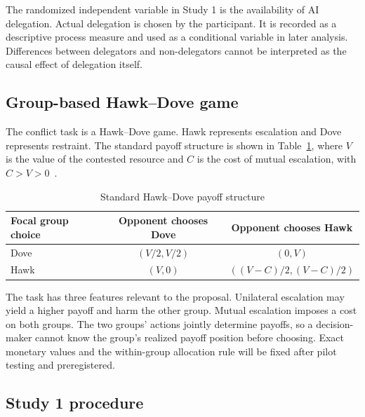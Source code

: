 \documentclass[11pt,a4paper]{article}
\begin{document}
The randomized independent variable in Study 1 is the availability of AI delegation. Actual delegation is chosen by the participant. It is recorded as a descriptive process measure and used as a conditional variable in later analysis. Differences between delegators and non-delegators cannot be interpreted as the causal effect of delegation itself.

\subsection{Group-based Hawk--Dove game}

The conflict task is a Hawk--Dove game. Hawk represents escalation and Dove represents restraint. The standard payoff structure is shown in Table~\ref{tab:hawk-dove}, where $V$ is the value of the contested resource and $C$ is the cost of mutual escalation, with $C>V>0$~\citep{MaynardSmithPrice1973}.

\begin{table}[H]
\centering
\caption{Standard Hawk--Dove payoff structure}
\label{tab:hawk-dove}
\begin{tabular}{lcc}
\toprule
\textbf{Focal group choice} & \textbf{Opponent chooses Dove} & \textbf{Opponent chooses Hawk}\\
\midrule
Dove & $(V/2,V/2)$ & $(0,V)$\\
Hawk & $(V,0)$ & $((V-C)/2,(V-C)/2)$\\
\bottomrule
\end{tabular}
\end{table}

The task has three features relevant to the proposal. Unilateral escalation may yield a higher payoff and harm the other group. Mutual escalation imposes a cost on both groups. The two groups' actions jointly determine payoffs, so a decision-maker cannot know the group's realized payoff position before choosing. Exact monetary values and the within-group allocation rule will be fixed after pilot testing and preregistered.

\subsection{Study 1 procedure}
\end{document}
